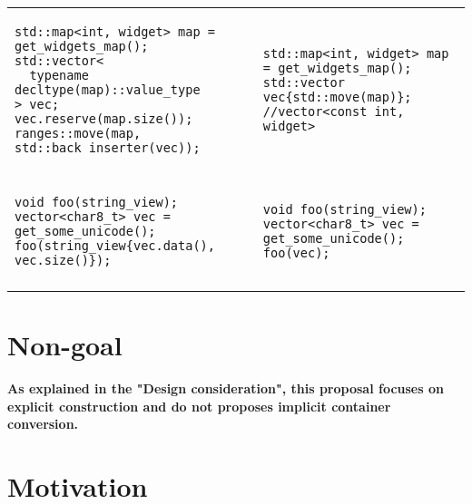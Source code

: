 \documentclass{wg21}
\begin{document}
\begin{center}
\begin{tabular}{l|l}
\begin{minipage}[t]{0.5\textwidth}
\begin{verbatim}
std::map<int, widget> map = get_widgets_map();
std::vector<
  typename decltype(map)::value_type
> vec;
vec.reserve(map.size());
ranges::move(map, std::back_inserter(vec));
\end{verbatim}
\end{minipage}
&
\begin{minipage}[t]{0.5\textwidth}
\begin{verbatim}
std::map<int, widget> map = get_widgets_map();
std::vector vec{std::move(map)};
//vector<const int, widget>
\end{verbatim}
\end{minipage}
\\\\ \hline

\begin{minipage}[t]{0.5\textwidth}
\begin{verbatim}
void foo(string_view);
vector<char8_t> vec = get_some_unicode();
foo(string_view{vec.data(), vec.size()});

\end{verbatim}
\end{minipage}
&
\begin{minipage}[t]{0.5\textwidth}
\begin{verbatim}
void foo(string_view);
vector<char8_t> vec = get_some_unicode();
foo(vec);
\end{verbatim}
\end{minipage}
\\\\ \hline

\end{tabular}
\end{center}

\section{Non-goal}

{\bf As explained in the "Design consideration", this proposal focuses on explicit construction and do not proposes implicit container conversion.}

\section{Motivation}
\end{document}
